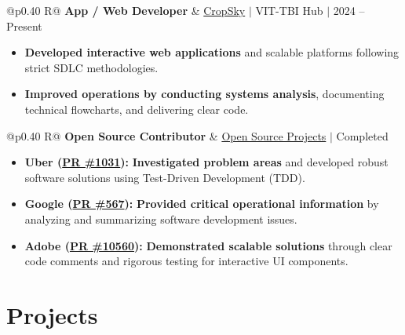 \documentclass[a4paper,11pt]{article}
\newcommand{\subheading}[1]{\textbf{#1}}
\newcommand{\meta}[1]{{\fontsize{10}{12}\selectfont\textcolor[HTML]{3A3A3A}{#1}}}
\newcommand{\ulink}[2]{\href{#1}{#2}}
\begin{document}
\begin{tabularx}{\linewidth}{@{}p{0.40\linewidth} R@{}}
\subheading{App / Web Developer} & \meta{\ulink{https://sites.google.com/view/cropsky/home}{CropSky} $|$ VIT-TBI Hub $|$ 2024 -- Present}
\end{tabularx}
\begin{itemize}[nosep, leftmargin=1.5em, itemsep=2pt, topsep=2pt]
  \item {\color[HTML]{0A0A0A}\fontsize{11}{14}\selectfont \textbf{Developed interactive web applications} and scalable platforms following strict SDLC methodologies.}
  \item {\color[HTML]{0A0A0A}\fontsize{11}{14}\selectfont \textbf{Improved operations by conducting systems analysis}, documenting technical flowcharts, and delivering clear code.}
\end{itemize}

\begin{tabularx}{\linewidth}{@{}p{0.40\linewidth} R@{}}
\subheading{Open Source Contributor} & \meta{\ulink{https://github.com/su-jin1425/My-Open-Source-Contributions}{Open Source Projects} $|$ Completed}
\end{tabularx}
\begin{itemize}[nosep, leftmargin=1.5em, itemsep=2pt, topsep=2pt]
  \item {\color[HTML]{0A0A0A}\fontsize{11}{14}\selectfont \textbf{Uber (\ulink{https://github.com/uber/causalml/pull/1031}{PR \#1031}):} \textbf{Investigated problem areas} and developed robust software solutions using Test-Driven Development (TDD).}
  \item {\color[HTML]{0A0A0A}\fontsize{11}{14}\selectfont \textbf{Google (\ulink{https://github.com/google/xrblocks/pull/567}{PR \#567}):} \textbf{Provided critical operational information} by analyzing and summarizing software development issues.}
  \item {\color[HTML]{0A0A0A}\fontsize{11}{14}\selectfont \textbf{Adobe (\ulink{https://github.com/adobe/react-spectrum/pull/10560}{PR \#10560}):} \textbf{Demonstrated scalable solutions} through clear code comments and rigorous testing for interactive UI components.}
\end{itemize}

\section{Projects}
\vspace{2pt}
\end{document}
